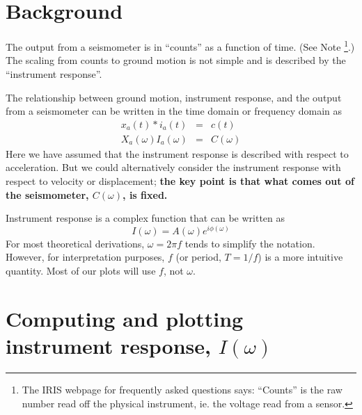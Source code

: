 \documentclass[11pt,titlepage,fleqn]{article}
\begin{document}

\section{Background}

The output from a seismometer is in ``counts'' as a function of time. (See Note \footnote{The IRIS webpage for frequently asked questions says: ``Counts'' is the raw number read off the physical instrument, ie. the voltage read from a sensor.}.) The scaling from counts to ground motion is not simple and is described by the ``instrument response''.

The relationship between ground motion, instrument response, and the output from a seismometer can be written in the time domain or frequency domain as
%
\begin{eqnarray}
x_a(t) * i_a(t) &=& c(t)
\\
X_a(\omega) I_a(\omega) &=& C(\omega)
\end{eqnarray}
%
Here we have assumed that the instrument response is described with respect to acceleration. But we could alternatively consider the instrument response with respect to velocity or displacement; {\bf the key point is that what comes out of the seismometer, $C(\omega)$, is fixed.}

Instrument response is a complex function that can be written as
%
\begin{equation}
I(\omega) = A(\omega) e^{i \phi(\omega)}
\label{Iw}
\end{equation}
%
For most theoretical derivations, $\omega = 2\pi f$ tends to simplify the notation. However, for interpretation purposes, $f$ (or period, $T = 1/f$) is a more intuitive quantity. Most of our plots will use $f$, not $\omega$.


\pagebreak
\section{Computing and plotting instrument response, $I(\omega)$}
\end{document}
